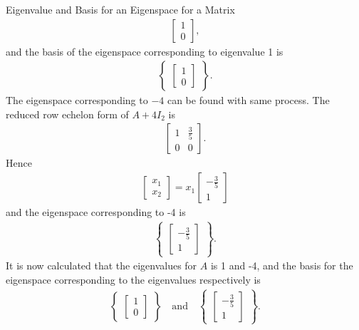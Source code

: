 \begin{example}{Eigenvalue and Basis for an Eigenspace for a Matrix}
\begin{align*}
         \begin{bmatrix}
            1\\0
        \end{bmatrix},
    \end{align*}
    and the basis of the eigenspace corresponding to eigenvalue 1 is
    \begin{align*}
    \begin{Bmatrix}
        \begin{bmatrix}
            1\\0
        \end{bmatrix}
    \end{Bmatrix}.
    \end{align*}
    The eigenspace corresponding to $-4$ can be found with same process.
    The reduced row echelon form of $A+4I_2$ is
        \begin{align*}
            \begin{bmatrix}
                1 & \frac{3}{5}\\
                0 & 0
            \end{bmatrix}.
    \end{align*}
    Hence
    \begin{align*}
        \begin{bmatrix}
            x_1\\x_2
        \end{bmatrix}=x_1
         \begin{bmatrix}
            -\frac{3}{5}\\1
        \end{bmatrix}
    \end{align*}
    and the eigenspace corresponding to -4 is
    \begin{align*}
    \begin{Bmatrix}
        \begin{bmatrix}
            -\frac{3}{5}\\1
        \end{bmatrix}
    \end{Bmatrix}.
    \end{align*}
    It is now calculated that the eigenvalues for $A$ is 1 and -4, and the basis for the eigenspace corresponding to the eigenvalues respectively is  
    \begin{align*}
    \begin{Bmatrix}
        \begin{bmatrix}
            1\\0
        \end{bmatrix}
    \end{Bmatrix}
      \quad \text{and} \quad
    \begin{Bmatrix}
        \begin{bmatrix}
            -\frac{3}{5}\\1
        \end{bmatrix}
    \end{Bmatrix}.
    \end{align*}
\end{example}

